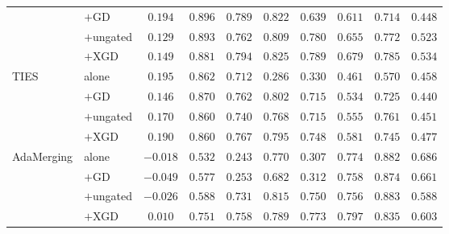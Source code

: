 \documentclass{article} %
\begin{document}
\begin{table}[p]
\begin{tabular}{llcccccccc}
          & $+$GD & $0.194$ & $0.896$ & $0.789$ & $0.822$ & $0.639$ & $0.611$ & $0.714$ & $0.448$ \\
          & $+$ungated & $0.129$ & $0.893$ & $0.762$ & $0.809$ & $0.780$ & $0.655$ & $0.772$ & $0.523$ \\
          & $+$XGD & $0.149$ & $0.881$ & $0.794$ & $0.825$ & $0.789$ & $0.679$ & $0.785$ & $0.534$ \\
\midrule
TIES & alone & $0.195$ & $0.862$ & $0.712$ & $0.286$ & $0.330$ & $0.461$ & $0.570$ & $0.458$ \\
     & $+$GD & $0.146$ & $0.870$ & $0.762$ & $0.802$ & $0.715$ & $0.534$ & $0.725$ & $0.440$ \\
     & $+$ungated & $0.170$ & $0.860$ & $0.740$ & $0.768$ & $0.715$ & $0.555$ & $0.761$ & $0.451$ \\
     & $+$XGD & $0.190$ & $0.860$ & $0.767$ & $0.795$ & $0.748$ & $0.581$ & $0.745$ & $0.477$ \\
\midrule
AdaMerging & alone & $-0.018$ & $0.532$ & $0.243$ & $0.770$ & $0.307$ & $0.774$ & $0.882$ & $0.686$ \\
           & $+$GD & $-0.049$ & $0.577$ & $0.253$ & $0.682$ & $0.312$ & $0.758$ & $0.874$ & $0.661$ \\
           & $+$ungated & $-0.026$ & $0.588$ & $0.731$ & $0.815$ & $0.750$ & $0.756$ & $0.883$ & $0.588$ \\
           & $+$XGD & $0.010$ & $0.751$ & $0.758$ & $0.789$ & $0.773$ & $0.797$ & $0.835$ & $0.603$ \\
\bottomrule
\end{tabular}
\end{table}
\end{document}
